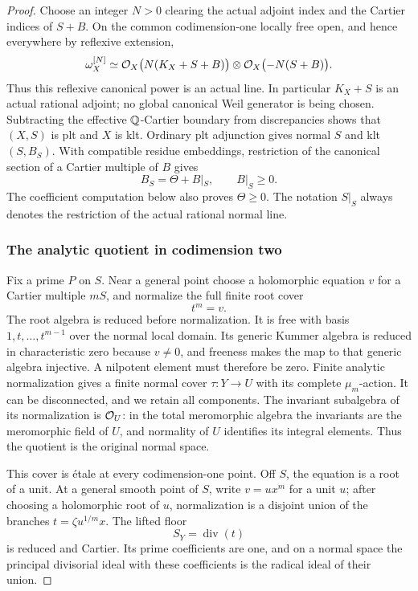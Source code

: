 \begin{proof}
Choose an integer \(N>0\) clearing the actual adjoint index and the
Cartier indices of \(S+B\).  On the common codimension-one locally free
open, and hence everywhere by reflexive extension,
\[
 \omega_X^{[N]}
 \simeq \mathcal O_X\bigl(N(K_X+S+B)\bigr)\otimes\mathcal O_X\bigl(-N(S+B)\bigr).
\]
Thus this reflexive canonical power is an actual line.  In particular
\(K_X+S\) is an actual rational adjoint; no global canonical Weil
generator is being chosen.  Subtracting the effective \(\mathbb Q\)-Cartier
boundary from discrepancies shows that \((X,S)\) is plt and \(X\) is
klt.  Ordinary plt adjunction
\cite[Lemma~5.3]{DasHacon2024OnMMP} gives normal \(S\) and klt
\((S,B_S)\).  With compatible residue embeddings, restriction of the
canonical section of a Cartier multiple of \(B\) gives
\[
 B_S=\Theta+B|_S,\qquad B|_S\geq0.
\]
The coefficient computation below also proves \(\Theta\geq0\).
The notation \(S|_S\) always denotes the restriction of the actual
rational normal line.

\subsubsection*{The analytic quotient in codimension two}

Fix a prime \(P\) on \(S\).  Near a general point choose a holomorphic
equation \(v\) for a Cartier multiple \(mS\), and normalize the full
finite root cover
\[
 t^m=v.
\]
The root algebra is reduced before normalization.  It is free with basis
\(1,t,\ldots,t^{m-1}\) over the normal local domain.  Its generic
Kummer algebra is reduced in characteristic zero because \(v\ne0\),
and freeness makes the map to that generic algebra injective.  A
nilpotent element must therefore be zero.
Finite analytic normalization
\cite[Part~B, Section~4, Corollaries~2--3]{Houzel1961}
gives a finite normal cover \(\tau:Y\to U\) with its complete
\(\mu_m\)-action.  It can be disconnected, and we retain all components.
The invariant subalgebra of its normalization is \(\mathcal O_U\):
in the total meromorphic algebra the invariants are the meromorphic
field of \(U\), and normality of \(U\) identifies its integral elements.
Thus the quotient is the original normal space.

This cover is étale at every codimension-one point.  Off \(S\), the
equation is a root of a unit.  At a general smooth point of \(S\), write
\(v=u x^m\) for a unit \(u\); after choosing a holomorphic root of \(u\),
normalization is a disjoint union of the branches
\(t=\zeta u^{1/m}x\).  The lifted floor
\[
 S_Y=\operatorname{div}(t)
\]
is reduced and Cartier.  Its prime coefficients are one, and on a
normal space the principal divisorial ideal with these coefficients is
the radical ideal of their union.


\end{proof}
